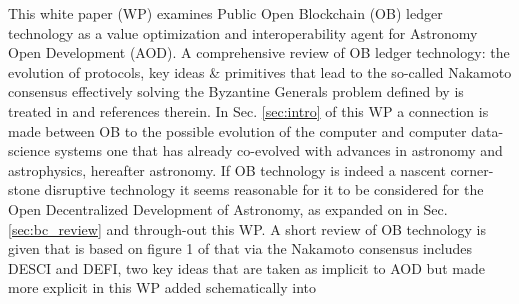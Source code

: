 \documentclass[final,5p,times,twocolumn,authoryear]{elsarticle}
\begin{document}
This white paper (WP) examines Public Open Blockchain (OB) ledger technology as a value optimization and interoperability agent for Astronomy Open Development (AOD). A comprehensive review of OB ledger technology: the evolution of protocols, key ideas \& primitives that lead to the so-called Nakamoto consensus effectively solving the Byzantine Generals problem defined by \cite{Lamport1982TheBG} is treated in  \cite{arvindandclark2017} and references therein. In Sec. \ref{sec:intro} of this WP a connection is made between OB to the possible evolution of the computer and computer data-science systems  one that has already co-evolved with advances in astronomy and astrophysics, hereafter astronomy. If OB technology is indeed a nascent corner-stone disruptive technology it seems reasonable for it to be considered for the Open Decentralized Development of Astronomy, as expanded on in Sec. \ref{sec:bc_review} and through-out this WP.  A short review of OB technology is given that is based on figure 1 of \cite{arvindandclark2017} that via the Nakamoto consensus includes DESCI and DEFI, two key ideas that are taken as implicit to AOD but made more explicit in this WP added schematically into 
\end{document}
